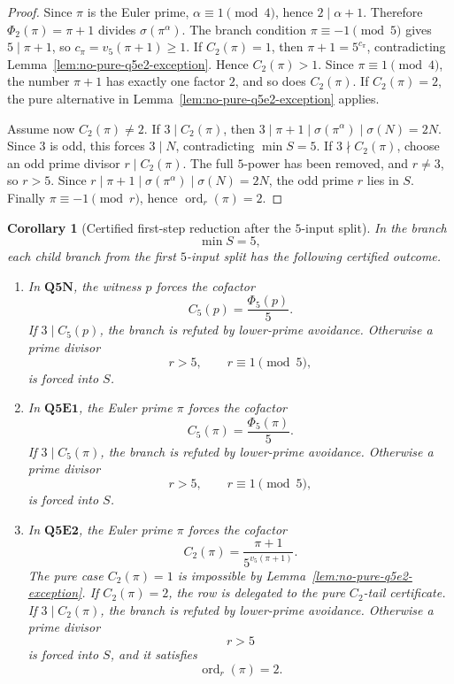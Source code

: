 \documentclass[11pt]{article}
\newtheorem{corollary}[theorem]{Corollary}
\theoremstyle{definition}
\theoremstyle{remark}
\DeclareMathOperator{\ord}{ord}
\begin{document}
\begin{proof}
Since \(\pi\) is the Euler prime, \(\alpha\equiv1\pmod4\), hence
\(2\mid\alpha+1\).  Therefore \(\Phi_2(\pi)=\pi+1\) divides
\(\sigma(\pi^\alpha)\).  The branch condition \(\pi\equiv-1\pmod5\) gives
\(5\mid\pi+1\), so \(c_\pi=v_5(\pi+1)\ge1\).  If \(C_2(\pi)=1\), then
\(\pi+1=5^{c_\pi}\), contradicting Lemma~\ref{lem:no-pure-q5e2-exception}.
Hence \(C_2(\pi)>1\).  Since \(\pi\equiv1\pmod4\), the number \(\pi+1\) has
exactly one factor \(2\), and so does \(C_2(\pi)\).  If \(C_2(\pi)=2\), the
pure alternative in Lemma~\ref{lem:no-pure-q5e2-exception} applies.

Assume now \(C_2(\pi)\ne2\).  If \(3\mid C_2(\pi)\), then
\(3\mid\pi+1\mid\sigma(\pi^\alpha)\mid\sigma(N)=2N\).  Since \(3\) is odd,
this forces \(3\mid N\), contradicting \(\min S=5\).  If
\(3\nmid C_2(\pi)\), choose an odd prime divisor \(r\mid C_2(\pi)\).  The full
\(5\)-power has been removed, and \(r\ne3\), so \(r>5\).  Since
\(r\mid\pi+1\mid\sigma(\pi^\alpha)\mid\sigma(N)=2N\), the odd prime \(r\)
lies in \(S\).  Finally \(\pi\equiv-1\pmod r\), hence \(\ord_r(\pi)=2\).
\end{proof}

\begin{corollary}[Certified first-step reduction after the $5$-input split]
\label{cor:q5-first-input-forced-reduction}
In the branch
\[
  \min S=5,
\]
each child branch from the first \(5\)-input split has the following certified
outcome.

\begin{enumerate}[label=(\roman*),leftmargin=2.2em]

\item In \(\mathbf{Q5N}\), the witness \(p\) forces the cofactor
      \[
        C_5(p)=\frac{\Phi_5(p)}5.
      \]
      If \(3\mid C_5(p)\), the branch is refuted by lower-prime avoidance.
      Otherwise a prime divisor
      \[
        r>5,\qquad r\equiv1\pmod5,
      \]
      is forced into \(S\).

\item In \(\mathbf{Q5E1}\), the Euler prime \(\pi\) forces the cofactor
      \[
        C_5(\pi)=\frac{\Phi_5(\pi)}5.
      \]
      If \(3\mid C_5(\pi)\), the branch is refuted by lower-prime avoidance.
      Otherwise a prime divisor
      \[
        r>5,\qquad r\equiv1\pmod5,
      \]
      is forced into \(S\).

\item In \(\mathbf{Q5E2}\), the Euler prime \(\pi\) forces the cofactor
      \[
        C_2(\pi)=\frac{\pi+1}{5^{v_5(\pi+1)}}.
      \]
      The pure case \(C_2(\pi)=1\) is impossible by
      Lemma~\ref{lem:no-pure-q5e2-exception}.  If \(C_2(\pi)=2\), the row is
      delegated to the pure \(C_2\)-tail certificate.  If \(3\mid C_2(\pi)\),
      the branch is refuted by lower-prime avoidance.  Otherwise a prime divisor
      \[
        r>5
      \]
      is forced into \(S\), and it satisfies
      \[
        \ord_r(\pi)=2.
      \]
\end{enumerate}
\end{corollary}
\end{document}
